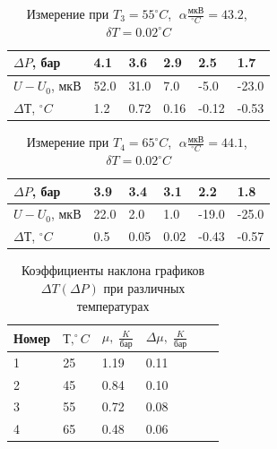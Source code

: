 \documentclass[a4paper,12pt]{article}
\begin{document}
\begin{enumerate}
		\begin{table}[h!] 
			\caption{Измерение при $T_3 = 55^\circ C$,$\;$ $\alpha\frac{мкВ}{^\circ C} = 43.2$,$\;$ $\delta T = 0.02^\circ C$}
			\begin{center}
				\begin{tabular}{|*{6}{l|}} \hline
					$\Delta P$, бар & 4.1 & 3.6 & 2.9 & 2.5 & 1.7 \\ \hline
					$U - U_0$, мкВ & 52.0 & 31.0 & 7.0 & -5.0 & -23.0 \\ \hline
					$\Delta Т$, $^\circ C$ & 1.2 & 0.72 & 0.16 & -0.12 & -0.53 \\ \hline
				\end{tabular}
			\end{center}
		\end{table}
	
		\begin{table}[h!] 
			\caption{Измерение при $T_4 = 65^\circ C$,$\;$ $\alpha\frac{мкВ}{^\circ C} = 44.1$,$\;$ $\delta T = 0.02^\circ C$}
			\begin{center}
				\begin{tabular}{|*{6}{l|}} \hline
					$\Delta P$, бар & 3.9 & 3.4 & 3.1 & 2.2 & 1.8 \\ \hline
					$U - U_0$, мкВ & 22.0 & 2.0 & 1.0 & -19.0 & -25.0 \\ \hline
					$\Delta Т$, $^\circ C$ & 0.5 & 0.05 & 0.02 & -0.43 & -0.57 \\ \hline
				\end{tabular}
			\end{center}
		\end{table}

		\begin{table}[h!] 
			\caption{Коэффициенты наклона графиков $\Delta T (\Delta P)$ при различных температурах}
			\begin{center}
				\begin{tabular}{|*{6}{l|}} \hline
					Номер & $Т, ^\circ C$ & $\mu,\; \frac{K}{бар}$ & $\Delta \mu,\; \frac{K}{бар}$ \\ \hline
					1 & 25 & 1.19 & 0.11 \\ \hline
					2 & 45 & 0.84 & 0.10 \\ \hline
					3 & 55 & 0.72 & 0.08 \\ \hline
					4 & 65 & 0.48 & 0.06 \\ \hline
				\end{tabular}
			\end{center}
		\end{table}
		

\end{enumerate}
\end{document}
